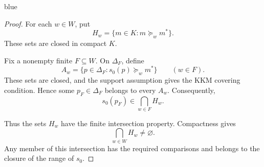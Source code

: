 \documentclass[11pt]{article}
\theoremstyle{definition}
\theoremstyle{remark}
\newenvironment{AIwritten}{\begin{color}{blue}}{\end{color}}
\begin{document}
\begin{AIwritten}
	
	\begin{proof}
		For each $w\in W$, put
		\[
		H_w=\{m\in K:m\succeq_w m^*\}.
		\]
		These sets are closed in compact $K$.
		
		Fix a nonempty finite $F\subseteq W$.
		On $\Delta_F$, define
		\[
		A_w=\{p\in\Delta_F:s_0(p)\succeq_w m^*\}
		\qquad(w\in F).
		\]
		These sets are closed, and the support assumption
		gives the KKM covering condition. Hence some
		$p_F\in\Delta_F$ belongs to every $A_w$.
		Consequently,
		\[
		s_0(p_F)\in\bigcap_{w\in F}H_w.
		\]
		
		Thus the sets $H_w$ have the finite intersection
		property. Compactness gives
		\[
		\bigcap_{w\in W}H_w\neq\varnothing.
		\]
		Any member of this intersection has the required
		comparisons and belongs to the closure of the
		range of $s_0$.
	\end{proof}
\end{AIwritten}
\end{document}
